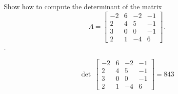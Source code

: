 
\begin{exerciseStatement}


Show how to compute the determinant of the matrix \[A= \left[\begin{array}{cccc}
-2 & 6 & -2 & -1 \\
2 & 4 & 5 & -1 \\
3 & 0 & 0 & -1 \\
2 & 1 & -4 & 6
\end{array}\right] .\].


\end{exerciseStatement}
    
\begin{exerciseAnswer} 
\[\operatorname{det}\  \left[\begin{array}{cccc}
-2 & 6 & -2 & -1 \\
2 & 4 & 5 & -1 \\
3 & 0 & 0 & -1 \\
2 & 1 & -4 & 6
\end{array}\right] = 843 \]
\end{exerciseAnswer}
    
